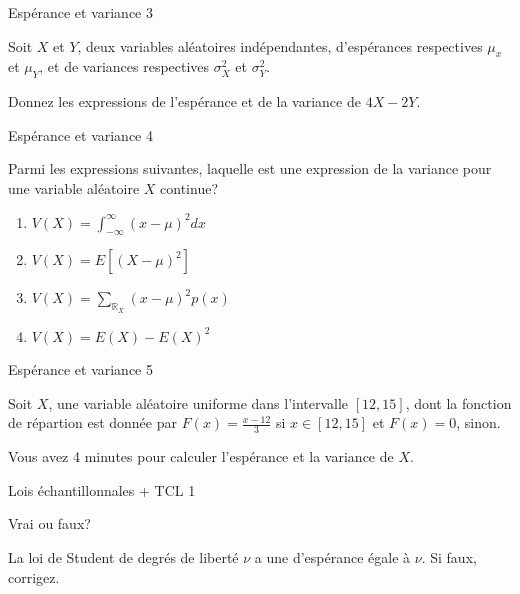 \documentclass{BeamerTemplate}
\begin{document}
\begin{frame}{Espérance et variance 3}\label{ev3}
\begin{center}
      Soit $X$ et $Y$, deux variables aléatoires indépendantes, d'espérances respectives $\mu_x$ et $\mu_Y$, et de variances respectives $\sigma^2_X$ et $\sigma^2_Y$.
      \medskip

      Donnez les expressions de l'espérance et de la variance de $4X-2Y$.
\end{center}

\end{frame}

\begin{frame}{Espérance et variance 4}\label{ev4}
\begin{center}
      Parmi les expressions suivantes, laquelle est une expression de la variance pour une variable aléatoire $X$ continue?

      \begin{enumerate}
          \item $V(X)=\int_{-\infty}^{\infty}(x-\mu)^2dx$
          \item $V(X)=E[(X-\mu)^2]$
          \item $V(X)=\sum_{\mathbb{R}_X}(x-\mu)^2p(x)$
          \item $V(X)=E(X)-E(X)^2$
      \end{enumerate}
\end{center}

\end{frame}

\begin{frame}{Espérance et variance 5}\label{ev5}
\begin{center}
      Soit $X$, une variable aléatoire uniforme dans l'intervalle $[12, 15]$, dont la fonction de répartion est donnée par $F(x)=\frac{x-12}{3}$ si $x \in [12,15]$ et $F(x)=0$, sinon. 

      \medskip

      Vous avez 4 minutes pour calculer l'espérance et la variance de $X$.
\end{center}

\end{frame}

\begin{frame}{Lois échantillonnales + TCL 1}\label{ech1}
\begin{center}

Vrai ou faux?
\medskip

      La loi de Student de degrés de liberté $\nu$ a une d'espérance égale à $\nu$. Si faux, corrigez.
\end{center}

\end{frame}
\end{document}
